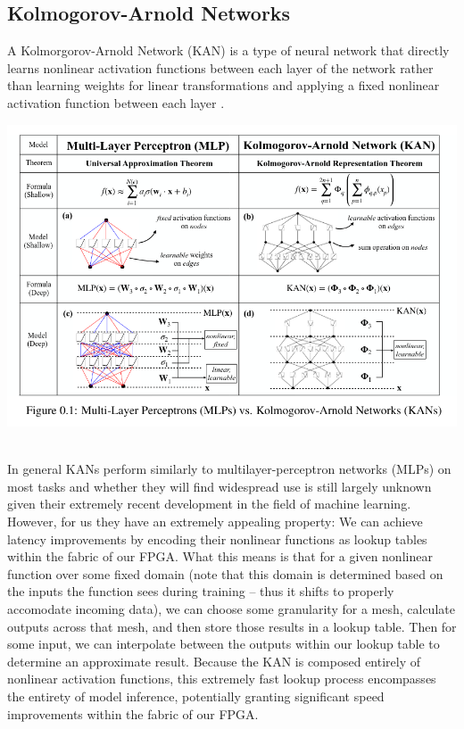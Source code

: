 \documentclass{article}
\begin{document}
\subsection{Kolmogorov-Arnold Networks}
A Kolmorgorov-Arnold Network (KAN) is a type of neural network that directly learns nonlinear activation functions between each layer of the network rather than learning weights for linear transformations and applying a fixed nonlinear activation function between each layer \cite{kan}.\\
\centerline{\includegraphics[scale=0.5]{mlpkan.png}}\\
In general KANs perform similarly to multilayer-perceptron networks (MLPs) on most tasks and whether they will find widespread use is still largely unknown given their extremely recent development in the field of machine learning. However, for us they have an extremely appealing property: We can achieve latency improvements by encoding their nonlinear functions as lookup tables within the fabric of our FPGA. What this means is that for a given nonlinear function over some fixed domain (note that this domain is determined based on the inputs the function sees during training -- thus it shifts to properly accomodate incoming data), we can choose some granularity for a mesh, calculate outputs across that mesh, and then store those results in a lookup table. Then for some input, we can interpolate between the outputs within our lookup table to determine an approximate result. Because the KAN is composed entirely of nonlinear activation functions, this extremely fast lookup process encompasses the entirety of model inference, potentially granting significant speed improvements within the fabric of our FPGA.
\end{document}
